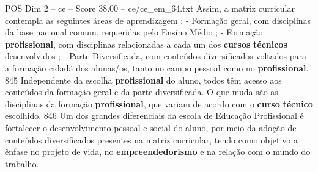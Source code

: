\begin{textsample}{POS Dim 2 – ce – Score 38.00 – ce/ce\_em\_64.txt}
Assim, a matriz curricular contempla as seguintes áreas de aprendizagem : - Formação geral, com disciplinas da base nacional comum, requeridas pelo Ensino Médio ; - Formação \textbf{profissional}, com disciplinas relacionadas a cada um dos \textbf{cursos} \textbf{técnicos} desenvolvidos ; - Parte Diversificada, com conteúdos diversificados voltados para a formação cidadã dos alunas/os, tanto no campo pessoal como no \textbf{profissional}. 845 Independente da escolha \textbf{profissional} do aluno, todos têm acesso aos conteúdos da formação geral e da parte diversificada.
O que muda são as disciplinas da formação \textbf{profissional}, que variam de acordo com o \textbf{curso} \textbf{técnico} escolhido. 846 Um dos grandes diferenciais da escola de Educação Profissional é fortalecer o desenvolvimento pessoal e social do aluno, por meio da adoção de conteúdos diversificados presentes na matriz curricular, tendo como objetivo a ênfase no projeto de vida, no \textbf{empreendedorismo} e na relação com o mundo do trabalho.

\end{textsample}

